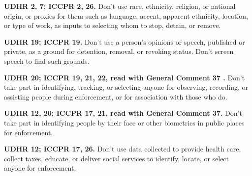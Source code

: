 \textbf{UDHR 2, 7; ICCPR 2, 26.} Don't use race, ethnicity, religion, or national origin, or proxies for them such as language, accent, apparent ethnicity, location, or type of work, as inputs to selecting whom to stop, detain, or remove.

\textbf{UDHR 19; ICCPR 19.} Don't use a person's opinions or speech, published or private, as a ground for detention, removal, or revoking status. Don't screen speech to find such grounds.

\textbf{UDHR 20; ICCPR 19, 21, 22, read with General Comment 37 \autocite{hrc2020gc37}.} Don't take part in identifying, tracking, or selecting anyone for observing, recording, or assisting people during enforcement, or for association with those who do.

\textbf{UDHR 12, 20; ICCPR 17, 21, read with General Comment 37.} Don't take part in identifying people by their face or other biometrics in public places for enforcement.

\textbf{UDHR 12; ICCPR 17, 26.} Don't use data collected to provide health care, collect taxes, educate, or deliver social services to identify, locate, or select anyone for enforcement.


